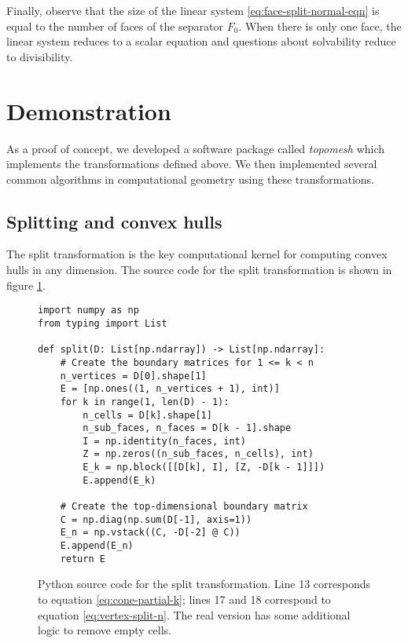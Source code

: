 \documentclass[twocolumn]{article}
\begin{document}
Finally, observe that the size of the linear system \eqref{eq:face-split-normal-eqn} is equal to the number of faces of the separator $F_0$.
When there is only one face, the linear system reduces to a scalar equation and questions about solvability reduce to divisibility.


\section{Demonstration}

As a proof of concept, we developed a software package called \emph{topomesh} which implements the transformations defined above.
We then implemented several common algorithms in computational geometry using these transformations.

\subsection{Splitting and convex hulls}

The split transformation is the key computational kernel for computing convex hulls in any dimension.
The source code for the split transformation is shown in figure \ref{fig:split-source-code}.
\begin{figure}
    \begin{verbatim}
import numpy as np
from typing import List

def split(D: List[np.ndarray]) -> List[np.ndarray]:
    # Create the boundary matrices for 1 <= k < n
    n_vertices = D[0].shape[1]
    E = [np.ones((1, n_vertices + 1), int)]
    for k in range(1, len(D) - 1):
        n_cells = D[k].shape[1]
        n_sub_faces, n_faces = D[k - 1].shape
        I = np.identity(n_faces, int)
        Z = np.zeros((n_sub_faces, n_cells), int)
        E_k = np.block([[D[k], I], [Z, -D[k - 1]]])
        E.append(E_k)

    # Create the top-dimensional boundary matrix
    C = np.diag(np.sum(D[-1], axis=1))
    E_n = np.vstack((C, -D[-2] @ C))
    E.append(E_n)
    return E
    \end{verbatim}
    \caption{Python source code for the split transformation.
    Line 13 corresponds to equation \eqref{eq:cone-partial-k}; lines 17 and 18 correspond to equation \eqref{eq:vertex-split-n}.
    The real version has some additional logic to remove empty cells.}
    \label{fig:split-source-code}
\end{figure}
\end{document}
